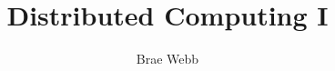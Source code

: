 \documentclass{csse4400}
\title{Distributed Computing I}
\author{Brae Webb}
\date{\week{5}}
\begin{document}
\makecover



% 
% 
\end{document}
